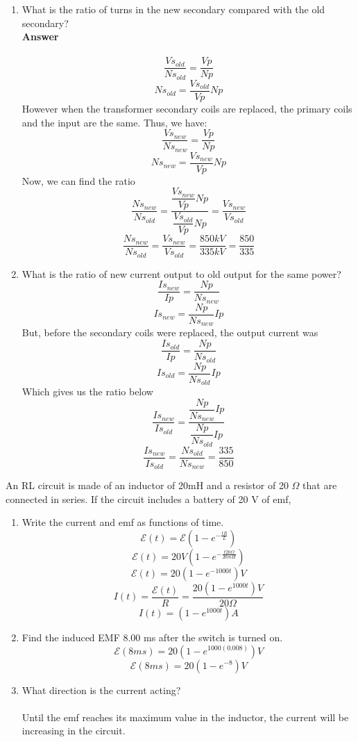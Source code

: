 \documentclass[11pt,addpoints]{exam}
\begin{document}
\begin{questions}
		\begin{enumerate}[label=(\roman*)]
			\item What is the ratio of turns in the new secondary compared with the old secondary? \\ \textbf{Answer} \\ \\
			$$\dfrac{Vs_{old}}{Ns_{old}}=\dfrac{Vp}{Np}$$
			$$Ns_{old}=\dfrac{Vs_{old}}{Vp}Np$$
			However when the transformer secondary coils are replaced, the primary coils and the input are the same. Thus, we have:
			$$\dfrac{Vs_{new}}{Ns_{new}}=\dfrac{Vp}{Np}$$
			$$Ns_{new}=\dfrac{Vs_{new}}{Vp}Np$$
			Now, we can find the ratio
			$$\dfrac{Ns_{new}}{Ns_{old}}=\dfrac{\dfrac{Vs_{new}}{Vp}Np}{\dfrac{Vs_{old}}{Vp}Np}=\dfrac{Vs_{new}}{Vs_{old}}$$
			$$\dfrac{Ns_{new}}{Ns_{old}}=\dfrac{Vs_{new}}{Vs_{old}}=\dfrac{850kV}{335kV}=\dfrac{850}{335}$$
			\item What is the ratio of new current output to old output for the same power? 
			$$\dfrac{Is_{new}}{Ip}=\dfrac{Np}{Ns_{new}}$$
			$$Is_{new}=\dfrac{Np}{Ns_{new}}Ip$$
			But, before the secondary coils were replaced, the output current was
			$$\dfrac{Is_{old}}{Ip}=\dfrac{Np}{Ns_{old}}$$
			$$Is_{old}=\dfrac{Np}{Ns_{old}}Ip$$
			Which gives us the ratio below
			$$\dfrac{Is_{new}}{Is_{old}}=\dfrac{\dfrac{Np}{Ns_{new}}Ip}{\dfrac{Np}{Ns_{old}}Ip}$$
			$$\dfrac{Is_{new}}{Is_{old}}=\dfrac{Ns_{old}}{Ns_{new}}=\dfrac{335}{850}$$
		\end{enumerate} 
		\question An RL circuit is made of an inductor of 20mH and a resistor of 20 $\Omega$ that are connected in series. If the circuit includes a battery of 20 V of emf, 
		\begin{enumerate}[label=(\roman*)]
			\item Write the current and emf as functions of time.
			$$\mathcal{E}(t)=\mathcal{E}(1-e^{-{\frac{tR}{L}}})$$
			$$\mathcal{E}(t)=20V(1-e^{-{\frac{t20\Omega}{20mH}}})$$
			$$\mathcal{E}(t)=20(1-e^{-1000t})V$$
			$$I(t)=\dfrac{\mathcal{E}(t)}{R}=\dfrac{20(1-e^{1000t})V}{20\Omega}$$
			$$I(t)=(1-e^{1000t})A$$
			\item Find the induced EMF 8.00 ms after the switch is turned on.
			$$\mathcal{E}(8ms)=20(1-e^{1000(0.008)})V$$
			$$\mathcal{E}(8ms)=20(1-e^{-8})V$$
			\item What direction is the current acting?	\\ \\
			Until the emf reaches its maximum value in the inductor, the current will be increasing in the circuit.
		\end{enumerate} 

\end{questions}
\end{document}
